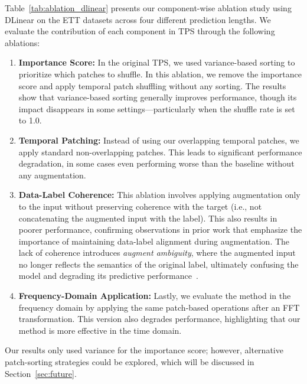 Table~\ref{tab:ablation_dlinear} presents our component-wise ablation study using DLinear on the ETT datasets across four different prediction lengths. We evaluate the contribution of each component in TPS through the following ablations:
\begin{enumerate}
    \item \textbf{Importance Score:} In the original TPS, we used variance-based sorting to prioritize which patches to shuffle. In this ablation, we remove the importance score and apply temporal patch shuffling without any sorting. The results show that variance-based sorting generally improves performance, though its impact disappears in some settings—particularly when the shuffle rate is set to 1.0.
    \item \textbf{Temporal Patching:} Instead of using our overlapping temporal patches, we apply standard non-overlapping patches. This leads to significant performance degradation, in some cases even performing worse than the baseline without any augmentation.
    \item \textbf{Data-Label Coherence:} This ablation involves applying augmentation only to the input without preserving coherence with the target (i.e., not concatenating the augmented input with the label). This also results in poorer performance, confirming observations in prior work that emphasize the importance of maintaining data-label alignment during augmentation. The lack of coherence introduces \textit{augment ambiguity}, where the augmented input no longer reflects the semantics of the original label, ultimately confusing the model and degrading its predictive performance~\cite{chen2023fraugfrequencydomainaugmentation, wei2020circumventingoutliersautoaugmentknowledge}.
    \item \textbf{Frequency-Domain Application:} Lastly, we evaluate the method in the frequency domain by applying the same patch-based operations after an FFT transformation. This version also degrades performance, highlighting that our method is more effective in the time domain.

\end{enumerate}


Our results only used variance for the importance score; however, alternative patch-sorting strategies could be explored, which will be discussed in Section~\ref{sec:future}.



